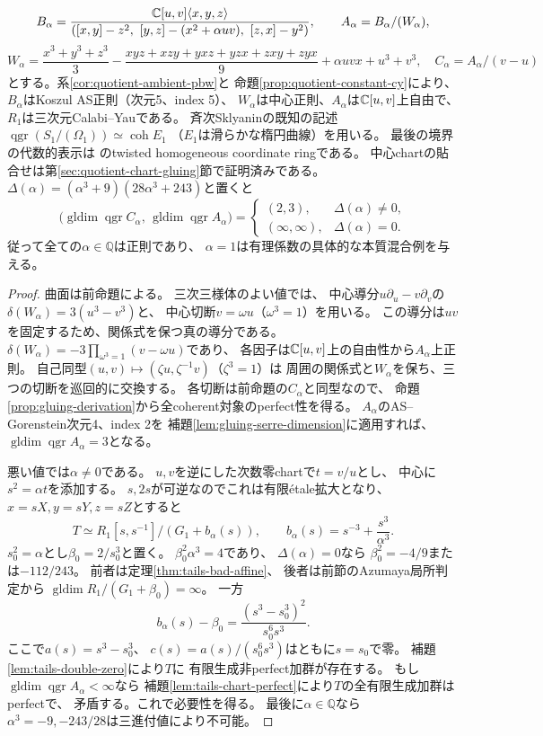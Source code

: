 \begin{theorem}[一混合項族の三次三様体と曲面の正確な判別式]
\label{thm:quotient-exact-tails}
\[
 B_\alpha=
 \frac{\mathbb C[u,v]\langle x,y,z\rangle}
 {([x,y]-z^2,\ [y,z]-(x^2+\alpha uv),\
   [z,x]-y^2)},\qquad
 A_\alpha=B_\alpha/(W_\alpha),
\]
\[
 W_\alpha=\frac{x^3+y^3+z^3}{3}
 -\frac{xyz+xzy+yxz+yzx+zxy+zyx}{9}
 +\alpha uvx+u^3+v^3,\quad C_\alpha=A_\alpha/(v-u)
\]
とする。系\ref{cor:quotient-ambient-pbw}と
命題\ref{prop:quotient-constant-cy}により、
$B_\alpha$はKoszul AS正則（次元5、index 5）、
$W_\alpha$は中心正則、$A_\alpha$は$\mathbb C[u,v]$上自由で、
$R_1$は三次元Calabi--Yauである。
斉次Sklyaninの既知の記述
$\operatorname{qgr}(S_1/(\Omega_1))\simeq\operatorname{coh}E_1$
（$E_1$は滑らかな楕円曲線）を用いる。
最後の境界の代数的表示は
\cite[Lemma~2.19]{WWYSklyanin}のtwisted homogeneous coordinate ringである。
中心chartの貼合せは第\ref{sec:quotient-chart-gluing}節で証明済みである。
$\Delta(\alpha)=(\alpha^3+9)(28\alpha^3+243)$と置くと
\[
 \bigl(\operatorname{gldim}\operatorname{qgr}C_\alpha,\,
 \operatorname{gldim}\operatorname{qgr}A_\alpha\bigr)
 =
 \begin{cases}(2,3),&\Delta(\alpha)\ne0,\\
 (\infty,\infty),&\Delta(\alpha)=0.
 \end{cases}
\]
従って全ての$\alpha\in\mathbb Q$は正則であり、
$\alpha=1$は有理係数の具体的な本質混合例を与える。
\end{theorem}
\begin{proof}
曲面は前命題による。
三次三様体のよい値では、
中心導分$u\partial_u-v\partial_v$の
$\delta(W_\alpha)=3(u^3-v^3)$と、
中心切断$v=\omega u$（$\omega^3=1$）を用いる。
この導分は$uv$を固定するため、関係式を保つ真の導分である。
$\delta(W_\alpha)=-3\prod_{\omega^3=1}(v-\omega u)$であり、
各因子は$\mathbb C[u,v]$上の自由性から$A_\alpha$上正則。
自己同型$(u,v)\mapsto(\zeta u,\zeta^{-1}v)$（$\zeta^3=1$）は
周囲の関係式と$W_\alpha$を保ち、三つの切断を巡回的に交換する。
各切断は前命題の$C_\alpha$と同型なので、
命題\ref{prop:gluing-derivation}から全coherent対象のperfect性を得る。
$A_\alpha$のAS--Gorenstein次元4、index 2を
補題\ref{lem:gluing-serre-dimension}に適用すれば、
$\operatorname{gldim}\operatorname{qgr}A_\alpha=3$となる。

悪い値では$\alpha\ne0$である。
$u,v$を逆にした次数零chartで$t=v/u$とし、
中心に$s^2=\alpha t$を添加する。
$s,2s$が可逆なのでこれは有限\'etale拡大となり、
$x=sX,y=sY,z=sZ$とすると
\[
 T\simeq R_1[s,s^{-1}]/(G_1+b_\alpha(s)),
 \qquad b_\alpha(s)=s^{-3}+\frac{s^3}{\alpha^3}.
\]
$s_0^2=\alpha$とし$\beta_0=2/s_0^3$と置く。
$\beta_0^2\alpha^3=4$であり、
$\Delta(\alpha)=0$なら
$\beta_0^2=-4/9$または$-112/243$。
前者は定理\ref{thm:tails-bad-affine}、
後者は前節のAzumaya局所判定から
$\operatorname{gldim}R_1/(G_1+\beta_0)=\infty$。
一方
\[
 b_\alpha(s)-\beta_0
 =\frac{(s^3-s_0^3)^2}{s_0^6s^3}.
\]
ここで$a(s)=s^3-s_0^3$、
$c(s)=a(s)/(s_0^6s^3)$はともに$s=s_0$で零。
補題\ref{lem:tails-double-zero}により$T$に
有限生成非perfect加群が存在する。
もし$\operatorname{gldim}\operatorname{qgr}A_\alpha<\infty$なら
補題\ref{lem:tails-chart-perfect}により$T$の全有限生成加群はperfectで、
矛盾する。これで必要性を得る。
最後に$\alpha\in\mathbb Q$なら
$\alpha^3=-9,-243/28$は三進付値により不可能。
\end{proof}

